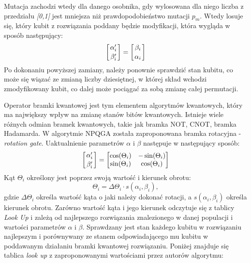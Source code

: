 Mutacja zachodzi wtedy dla danego osobnika, gdy wylosowana dla niego liczba z przedziału \textit{[0,1]} jest mniejsza niż prawdopodobieństwo mutacji $p_m$. Wtedy losuje się, który kubit z rozwiązania poddany będzie modyfikacji, która wygląda w sposób następujący:
\newline
\begin{equation}
\left[ {\alpha_i^\prime \atop \beta_i^\prime} \right] = \left[ {\beta_i \atop \alpha_i} \right]
\end{equation}
\newline
Po dokonaniu powyższej zamiany, należy ponownie sprawdzić stan kubitu, co może się wiązać ze zmianą liczby dziesiętnej, w której skład wchodzi zmodyfikowany kubit, co dalej może pociągać za sobą zmianę całej permutacji.

Operator bramki kwantowej jest tym elementem algorytmów kwantowych, który ma największy wpływ na zmianę stanów bitów kwantowych. Istnieje wiele różnych odmian bramek kwantowych, takie jak bramka NOT, CNOT, bramka Hadamarda. W algorytmie NPQGA została zaproponowana bramka rotacyjna - \textit{rotation gate}. Uaktualnienie parametrów \textit{$\alpha$} i \textit{$\beta$} następuje w następujący sposób:
\newline
\begin{equation}
\left[ {\alpha_i^\prime \atop \beta_i^\prime} \right] = \begin{bmatrix}
\cos(\Theta_i) & -\sin(\Theta_i) \\ \sin(\Theta_i) & \cos(\Theta_i)
\end{bmatrix}
\end{equation}
\newline
Kąt $\Theta_i$ określony jest poprzez swoją wartość i kierunek obrotu:
\newline
\begin{equation}
\Theta_i=\Delta \Theta_i \cdot s(\alpha_i, \beta_i),
\end{equation}
\newline
gdzie $\Delta \Theta_i$ określa wartość kąta o jaki należy dokonać rotacji, a $s(\alpha_i, \beta_i)$ określa kierunek obrotu. Zarówno wartość kąta i jego kierunek  odczytuje się z tablicy \textit{Look Up} i zależą od najlepszego rozwiązania znalezionego w danej populacji i wartości parametrów $\alpha$ i $\beta$. Sprawdzany jest stan każdego kubitu w rozwiązaniu najlepszym i porównywany ze stanem odpowiadającego mu kubitu w poddawanym działaniu bramki kwantowej rozwiązaniu. Poniżej znajduje się tablica  \textit{look up} z zaproponowanymi wartościami przez autorów algorytmu:
